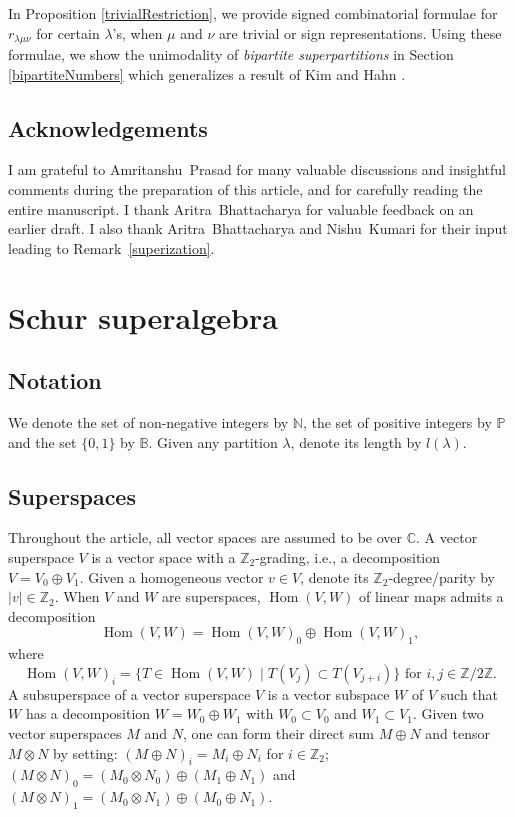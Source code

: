 \documentclass[12pt,reqno]{amsart}
\theoremstyle{definition}
\theoremstyle{remark}
\DeclareMathOperator{\Hom}{Hom}
\begin{document}
In Proposition \ref{trivialRestriction}, we provide signed combinatorial formulae for $r_{\lambda\mu\nu}$ for certain $\lambda$'s, when $\mu$ and $\nu$ are trivial or sign representations. Using these formulae, we show the unimodality of \textit{bipartite superpartitions} in Section \ref{bipartiteNumbers} which generalizes a result of Kim and Hahn \cite{kim1997partitions}.

\subsection{Acknowledgements}I am grateful to Amritanshu~Prasad for many valuable discussions and insightful comments during the preparation of this article, and for carefully reading the entire manuscript. I thank Aritra~Bhattacharya for valuable feedback on an earlier draft. I also thank Aritra~Bhattacharya and Nishu~Kumari for their input leading to Remark~\ref{superization}.


\section{Schur superalgebra}
\subsection{Notation} We denote the set of non-negative integers by $\mathbb{N}$, the set of positive integers by $\mathbb{P}$ and the set $\{0,1\}$ by $\mathbb{B}$. Given any partition $\lambda$, denote its length by $l(\lambda)$.
\subsection{Superspaces} Throughout the article, all vector spaces are assumed to be over $\mathbb{C}$. A vector superspace $V$ is a vector space with a $\mathbb{Z}_2$-grading, i.e., a decomposition $V=V_{0}\oplus V_{1}$. Given a homogeneous vector $v\in V$, denote its $\mathbb{Z}_2$-degree/parity by $|v|\in\mathbb{Z}_2$.
When $V$ and $W$ are superspaces, $\Hom(V,W)$ of linear maps admits a decomposition
$$
    \Hom(V,W) = \Hom(V,W)_0 \oplus \Hom(V,W)_1,
$$
where
$$
\Hom(V,W)_i = \{T\in \Hom(V,W)\mid T(V_j)\subset T(V_{j+i})\} \text{ for }i,j\in \mathbb Z/2\mathbb Z.
$$
A subsuperspace of a vector superspace $V$ is a vector subspace $W$ of $V$ such that $W$ has a decomposition $W=W_{0}\oplus W_{1}$ with $W_0\subset V_0$ and $W_1\subset V_1$. Given two vector superspaces $M$ and $N$, one can form their direct sum $M\oplus N$ and tensor $M\otimes N$ by setting:
$(M\oplus N)_{i}=M_{i}\oplus N_{i}$ for $i\in\mathbb{Z}_{2}$; $(M\otimes N)_{0}=(M_{0}\otimes N_{0})\oplus (M_{1}\oplus N_{1})$ and $(M\otimes N)_{1}=(M_{0}\otimes N_{1})\oplus (M_{0}\oplus N_{1})$.
\end{document}
